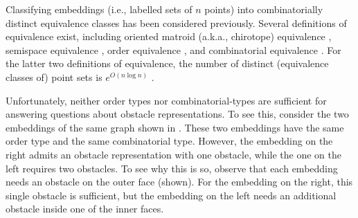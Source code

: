 \documentclass{patmorin}
\begin{document}
Classifying embeddings (i.e., labelled sets of $n$ points) into
combinatorially distinct equivalence classes has been considered
previously. Several definitions of equivalence exist, including oriented
matroid (a.k.a., chirotope) equivalence
\cite{bland.vergnas:orientability,folkman.lawrence:oriented},
semispace equivalence \cite{goodman.pollack:semispaces}, order equivalence
\cite{goodman.pollack:multidimensional}, and combinatorial equivalence
\cite{goodman:on,goodman.pollack:semispaces}.  For the latter two
definitions of equivalence, the number of distinct (equivalence classes
of) point sets is $e^{O(n\log n)}$ \cite{goodman.pollack:upper}.


Unfortunately, neither order types nor combinatorial-types are
sufficient for answering questions about obstacle representations.
To see this, consider the two embeddings of the same graph shown in
.  These two embeddings have the same order
type and the same combinatorial type. However, the embedding on the right
admits an obstacle representation with one obstacle, while the one on
the left requires two obstacles. To see why this is so, observe that each
embedding needs an obstacle on the outer face (shown). For the embedding
on the right, this single obstacle is sufficient, but the embedding
on the left needs an additional obstacle inside one of the inner faces.
\end{document}
